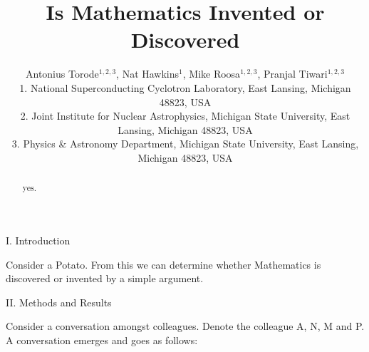 \documentclass[11pt]{article}
\title{Is Mathematics Invented or Discovered}
\author{Antonius Torode$^{1,2,3}$, Nat Hawkins$^{1}$, Mike Roosa$^{1,2,3}$, Pranjal Tiwari$^{1,2,3}$ \\ \scriptsize{1. National Superconducting Cyclotron Laboratory, East Lansing, Michigan 48823, USA} \\ \scriptsize{2. Joint Institute for Nuclear Astrophysics, Michigan State University, East Lansing, Michigan 48823, USA} \\ \scriptsize{3. Physics \& Astronomy Department, Michigan State University, East Lansing, Michigan 48823, USA}}
\begin{document}
\maketitle
\thispagestyle{fancy}

\begin{abstract}
	yes.
\end{abstract}

\begin{multicols}{2}
	
\begin{center}
	I. Introduction
\end{center}

Consider a Potato. From this we can determine whether Mathematics is discovered or invented by a simple argument.


\begin{center}
	II. Methods and Results
\end{center}

Consider a conversation amongst colleagues. Denote the colleague A, N, M and P. A conversation emerges and goes as follows: 


\end{multicols}
\end{document}

